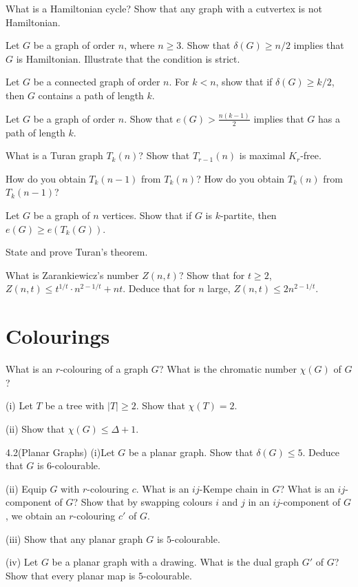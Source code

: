 \begin{question}{3.2}
	What is a Hamiltonian cycle? Show that any graph with a cutvertex is not Hamiltonian.
	
	Let $G$ be a graph of order $n$, where $n \geq 3$. Show that $\delta(G) \geq n/2$ implies that $G$ is Hamiltonian. Illustrate that the condition is strict.
	
\end{question}

\begin{question}{3.3}
	Let $G$ be a connected graph of order $n$. For $k < n$, show that if $\delta(G) \geq k/2$, then $G$ contains a path of length $k$.
	
	Let $G$ be a graph of order $n$. Show that $e(G) > \frac{n(k-1)}{2}$ implies that $G$ has a path of length $k$.
\end{question}

\begin{question}{3.4}
	What is a Turan graph $T_k(n)$? Show that $T_{r-1}(n)$ is maximal $K_r$-free.
	
	How do you obtain $T_k(n-1)$ from $T_k(n)$? How do you obtain $T_k(n)$ from $T_k(n-1)$?
	
	Let $G$ be a graph of $n$ vertices. Show that if $G$ is $k$-partite, then $e(G) \geq e(T_k(G))$.
	
	State and prove Turan's theorem.
\end{question}

\begin{question}{3.5}
	What is Zarankiewicz's number $Z(n,t)$? Show that for $t \geq 2$, $Z(n,t) \leq t^{1/t} \cdot n^{2- 1/t} + nt$. Deduce that for $n$ large, $Z(n,t) \leq 2n^{2-1/t}$.
\end{question}

\section{Colourings}
\begin{question}{4.1}
	What is an $r$-colouring of a graph $G$? What is the chromatic number $\chi(G)$ of $G$?
	
	(i) Let $T$ be a tree with $|T| \geq 2$. Show that $\chi(T) = 2$.
	
	(ii) Show that $\chi(G) \leq \Delta + 1$. 
\end{question}

\begin{question}{4.2(Planar Graphs)}
	(i)Let $G$ be a planar graph. Show that $\delta(G) \leq 5$. Deduce that $G$ is $6$-colourable.
	
	(ii) Equip $G$ with $r$-colouring $c$. What is an $ij$-Kempe chain in $G$? What is an $ij$-component of $G$? Show that by swapping colours $i$ and $j$ in an $ij$-component of $G$, we obtain an $r$-colouring $c'$ of $G$.
	
	(iii)  Show that any planar graph $G$ is $5$-colourable.
	
	(iv) Let $G$ be a planar graph with a drawing. What is the dual graph $G'$ of $G$? Show that every planar map is $5$-colourable.
\end{question}

